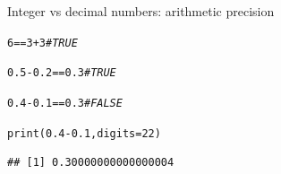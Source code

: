 \documentclass[xcolor=table,       handout,    xcolor=dvipsnames]{beamer}\usepackage[]{graphicx}\usepackage[]{color}
\makeatletter
\newcommand{\hlnum}[1]{\textcolor[rgb]{0,0,0}{#1}}
\newcommand{\hlcom}[1]{\textcolor[rgb]{0,0.392,0}{\textit{#1}}}
\newcommand{\hlopt}[1]{\textcolor[rgb]{0,0,0}{#1}}
\newcommand{\hlstd}[1]{\textcolor[rgb]{0,0,0}{#1}}
\newcommand{\hlkwc}[1]{\textcolor[rgb]{1,0,1}{#1}}
\newcommand{\hlkwd}[1]{\textcolor[rgb]{0,0,1}{#1}}
\newenvironment{kframe}{%
 \def\at@end@of@kframe{}%
 \ifinner\ifhmode%
  \def\at@end@of@kframe{\end{minipage}}%
  \begin{minipage}{\columnwidth}%
 \fi\fi%
 \def\FrameCommand##1{\hskip\@totalleftmargin \hskip-\fboxsep
 \colorbox{shadecolor}{##1}\hskip-\fboxsep
     \hskip-\linewidth \hskip-\@totalleftmargin \hskip\columnwidth}%
 \MakeFramed {\advance\hsize-\width
   \@totalleftmargin\z@ \linewidth\hsize
   \@setminipage}}%
 {\par\unskip\endMakeFramed%
 \at@end@of@kframe}
\newenvironment{knitrout}{}{} %
\makeatother
\begin{document}

\begin{frame}[fragile]{Integer vs decimal numbers: arithmetic precision}
\label{intnum}
\vspace{-1em}
\begin{knitrout}
\color{fgcolor}\begin{kframe}
\begin{alltt}
\hlnum{6}  \hlopt{==}  \hlnum{3} \hlopt{+} \hlnum{3}          \hlcom{# TRUE}
\end{alltt}
\end{kframe}
\end{knitrout}
\pause
\vspace{-1em}
\begin{knitrout}
\color{fgcolor}\begin{kframe}
\begin{alltt}
\hlnum{0.5} \hlopt{-} \hlnum{0.2}  \hlopt{==}  \hlnum{0.3}    \hlcom{# TRUE}
\end{alltt}
\end{kframe}
\end{knitrout}
\vspace{-1em}
\pause
\begin{knitrout}
\color{fgcolor}\begin{kframe}
\begin{alltt}
\hlnum{0.4} \hlopt{-} \hlnum{0.1}  \hlopt{==}  \hlnum{0.3}    \hlcom{# FALSE}
\end{alltt}
\end{kframe}
\end{knitrout}
\vspace{-1em}
\pause
\begin{knitrout}
\color{fgcolor}\begin{kframe}
\begin{alltt}
\hlkwd{print}\hlstd{(}\hlnum{0.4}\hlopt{-}\hlnum{0.1} \hlstd{,} \hlkwc{digits}\hlstd{=}\hlnum{22}\hlstd{)}
\end{alltt}
\begin{verbatim}
## [1] 0.30000000000000004
\end{verbatim}
\end{kframe}
\end{knitrout}
\vspace{-1em}
\pause
\begin{knitrout}

\end{knitrout}
\end{frame}
\end{document}

